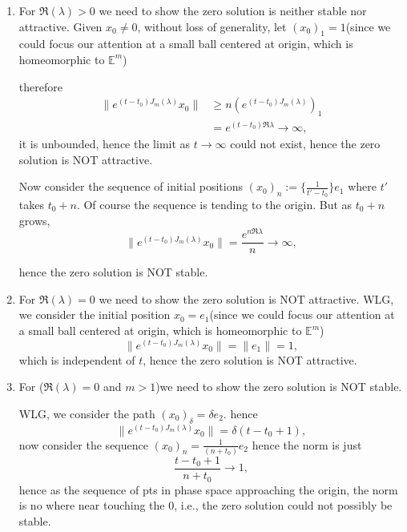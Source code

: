 \documentclass{tufte-handout}
\newcommand\n[1]{\lVert#1\rVert}
\begin{document}
\begin{formalproof}
\begin{enumerate}[label=\textbf{Case \Roman*:},leftmargin=1.3cm]
	\item For $\Re(\lambda)>0$ we need to show the zero solution is neither stable nor attractive.
	Given $x_0 \neq 0$, without loss of generality, let $(x_0)_1 =1 $(since we could focus our attention at a small ball centered at origin, which is homeomorphic to $\mathbb{E}^m$)
	
	therefore 
	\begin{align*}
		\n{e^{(t-t_0)J_m(\lambda)} x_0} &\geq n{(e^{(t-t_0)J_m(\lambda)})_1}  \\
		& = e^{(t-t_0)\Re{\lambda}} \to \infty,
	\end{align*}
	it is unbounded, hence the limit as $t\to \infty$ could not exist, hence the zero solution is NOT attractive.
	
	Now consider the sequence of initial positions ${(x_0)_n} :=\{ \frac{1}{t'-t_0} \}e_1 $ where $t'$ takes $t_0+n$. Of course the sequence is tending to the origin. But as $t_0+n$ grows, \[ \n{e^{(t-t_0)J_m(\lambda)} x_0} = \frac{e^{n\Re{\lambda}}}{n} \to \infty, \]
	
	hence the zero solution is NOT stable.
	
	\item For $\Re(\lambda)=0$ we need to show the zero solution is NOT attractive. WLG, we consider the initial position $x_0=e_1$(since we could focus our attention at a small ball centered at origin, which is homeomorphic to $\mathbb{E}^m$)
	\[ \n{e^{(t-t_0)J_m(\lambda)} x_0} =  \n{e_1}=1, \]
	which is independent of $t$, hence the zero solution is NOT attractive.
	\item For ($\Re(\lambda)=0$ and $m>1$)we need to show the zero solution is NOT stable.

	WLG, we consider the path $(x_0)_\delta = \delta e_2$. hence  \[ \n{e^{(t-t_0)J_m(\lambda)} x_0} =  \delta (t-t_0 + 1), \]
    now consider the sequence $(x_0)_{n}= \frac{1}{(n+t_0)} e_2$ hence the norm is just \[  \frac{t-t_0+1}{n+t_0} \to 1, \]
    hence as the sequence of pts in phase space approaching the origin, the norm is no where near touching the 0, i.e., the zero solution could not possibly be stable.
\end{enumerate}

 \end{formalproof}
\end{document}
